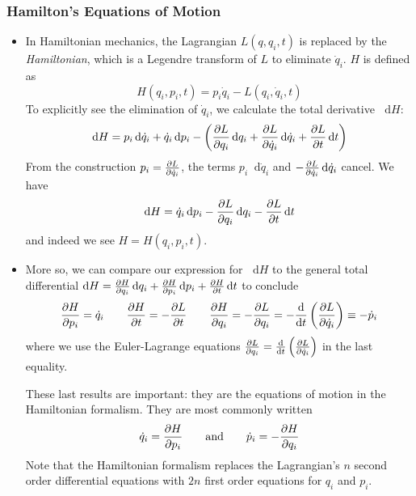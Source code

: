 \documentclass[11pt, a4paper]{article}
\newcommand{\eqtext}[1]{\qquad \text{#1} \qquad}
\newcommand{\diff}{\mathop{}\!\mathrm{d}} %
\begin{document}
\subsubsection{Hamilton's Equations of Motion}
\begin{itemize}
	\item In Hamiltonian mechanics, the Lagrangian $ L(q, q_{i}, t) $ is replaced by the \textit{Hamiltonian}, which is a Legendre transform of $ L $ to eliminate $ \dot{q}_{i} $. $ H $ is defined as
	\begin{equation*}
		H(q_{i}, p_{i}, t) = p_{i}\dot{q}_{i} - L(q_{i}, \dot{q}_{i}, t) 
	\end{equation*}
	To explicitly see the elimination of $ \dot{q}_{i} $, we calculate the total derivative $ \diff H $:
	\begin{equation*}
		\diff H = p_{i} \diff \dot{q}_{i} + \dot{q}_{i} \diff p_{i} - \left(\pdv{L}{q_{i}}\diff q_{i} + \pdv{L}{\dot{q}_{i}}\diff \dot{q}_{i} + \pdv{L}{t}\diff t\right)
	\end{equation*}
	From the construction $ p_{i} = \pdv{L}{\dot{q}_{i}} $, the terms $ p_{i} \diff \dot{q}_{i} $ and $ - \pdv{L}{\dot{q}_{i}}\diff \dot{q}_{i} $ cancel. We have
	\begin{equation*}
		\diff H = \dot{q}_{i} \diff p_{i} - \pdv{L}{q_{i}}\diff q_{i} - \pdv{L}{t}\diff t
	\end{equation*}
	and indeed we see $ H = H(q_{i}, p_{i}, t) $. 
	
	\item More so, we can compare our expression for $ \diff H $ to the general total differential $ \diff H = \pdv{H}{q_{i}} \diff q_{i} + \pdv{H}{p_{i}} \diff p_{i} + \pdv{H}{t} \diff t$ to conclude
	\begin{equation*}
		\pdv{H}{p_{i}} = \dot{q}_{i} \qquad \pdv{H}{t} = -\pdv{L}{t} \qquad \pdv{H}{q_{i}} = - \pdv{L}{q_{i}} = - \dv{}{t}\left(\pdv{L}{\dot{q}_{i}}\right) \equiv - \dot{p}_{i}
	\end{equation*}
	where we use the Euler-Lagrange equations $ \pdv{L}{q_{i}} = \dv{}{t}\left(\pdv{L}{\dot{q}_{i}}\right) $ in the last equality.
	
	These last results are important: they are the equations of motion in the Hamiltonian formalism. They are most commonly written
	\begin{equation*}
		 \dot{q}_{i} = \pdv{H}{p_{i}} \eqtext{and} \dot{p}_{i} = - \pdv{H}{q_{i}} 
	\end{equation*}
	Note that the Hamiltonian formalism replaces the Lagrangian's $ n $ second order differential equations with $ 2n $ first order equations for $ q_{i} $ and $ p_{i} $.
\end{itemize}
\end{document}
